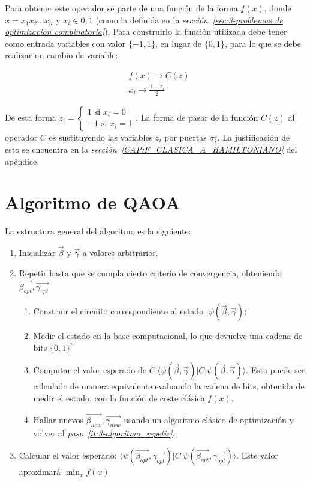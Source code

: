 Para obtener este operador se parte de una función de la forma \(f(x)\), donde \(x=x_1x_2 \ldots x_n\) y \(x_i\in{0, 1}\) (como la definida en la \textit{sección~\ref{sec:3-problemas de optimizacion combinatoria}}). Para construirlo la función utilizada debe tener como entrada variables con valor \(\{-1, 1\}\), en lugar de \(\{0, 1\}\), para lo que se debe realizar un cambio de variable:

\begin{align*}
  &f(x) \rightarrow C(z) \\
  &x_i \rightarrow \frac{1 - z_i}{2}
\end{align*}

De esta forma \(z_i = \begin{cases}
  1 \text{ si } x_i = 0 \\
  -1 \text{ si } x_i = 1
\end{cases}\).
La forma de pasar de la función $C(z)$ al operador $C$ es sustituyendo las variables \(z_i\) por puertas \(\sigma^z_i\). La justificación de esto se encuentra en la \textit{sección~\ref{CAP:F_CLASICA_A_HAMILTONIANO}} del apéndice.

\section{Algoritmo de QAOA}
La estructura general del algoritmo es la siguiente:
\begin{enumerate}
\item Inicializar $\vec{\beta}$ y $\vec{\gamma}$ a valores arbitrarios.
\item\label{it:3-algoritmo_repetir}
  Repetir hasta que se cumpla cierto criterio de convergencia, obteniendo $\vec{\beta_{opt}}, \vec{\gamma_{opt}}$
  \begin{enumerate}
  \item Construir el circuito correspondiente al estado $\lvert\psi(\vec{\beta}, \vec{\gamma})\rangle$
  \item Medir el estado en la base computacional, lo que devuelve una cadena de bits ${\{0, 1\}}^n$
  \item Computar el valor esperado de $C$:\@$\langle \psi(\vec{\beta}, \vec{\gamma}) \rvert C \lvert \psi(\vec{\beta}, \vec{\gamma}) \rangle$.
    Esto puede ser calculado de manera equivalente evaluando la cadena de bits, obtenida de medir el estado, con la función de coste clásica $f(x)$.
  \item Hallar nuevos \(\vec{\beta_{new}}, \vec{\gamma_{new}}\) usando un algoritmo clásico de optimización y volver al \textit{paso~\ref{it:3-algoritmo_repetir}}.
  \end{enumerate}
\item Calcular el valor esperado: \( \langle \psi(\vec{\beta_{opt}}, \vec{\gamma_{opt}}) \rvert C \lvert \psi(\vec{\beta_{opt}}, \vec{\gamma_{opt}}) \rangle \). Este valor aproximará \(\min_{x}f(x)\)
\end{enumerate}

